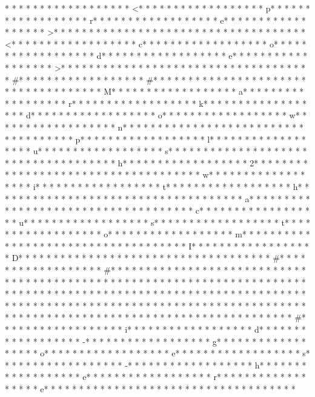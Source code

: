 * * *  * * *  * * *  *  * * *  *  * * *  * <* * *  * * *  * * *  *  * * *  *  * * *  * p* * *  * * *  * * *  *  * * *  *  * * *  * r* * *  * * *  * * *  *  * * *  *  * * *  * e* * *  * * *  * * *  *  * * *  *  * * *  * >* * *  * * *  * * *  *  * * *  *  * * *  * 
* * *  * * *  * * *  *  * * *  *  * * *  * <* * *  * * *  * * *  *  * * *  *  * * *  * c* * *  * * *  * * *  *  * * *  *  * * *  * o* * *  * * *  * * *  *  * * *  *  * * *  * d* * *  * * *  * * *  *  * * *  *  * * *  * e* * *  * * *  * * *  *  * * *  *  * * *  * >* * *  * * *  * * *  *  * * *  *  * * *  * 
* * *  * * *  * * *  *  * * *  *  * * *  * #* * *  * * *  * * *  *  * * *  *  * * *  * #* * *  * * *  * * *  *  * * *  *  * * *  *  * * *  * * *  * * *  *  * * *  *  * * *  * M* * *  * * *  * * *  *  * * *  *  * * *  * a* * *  * * *  * * *  *  * * *  *  * * *  * r* * *  * * *  * * *  *  * * *  *  * * *  * k* * *  * * *  * * *  *  * * *  *  * * *  * d* * *  * * *  * * *  *  * * *  *  * * *  * o* * *  * * *  * * *  *  * * *  *  * * *  * w* * *  * * *  * * *  *  * * *  *  * * *  * n* * *  * * *  * * *  *  * * *  *  * * *  *  * * *  * * *  * * *  *  * * *  *  * * *  * p* * *  * * *  * * *  *  * * *  *  * * *  * l* * *  * * *  * * *  *  * * *  *  * * *  * u* * *  * * *  * * *  *  * * *  *  * * *  * s* * *  * * *  * * *  *  * * *  *  * * *  *  * * *  * * *  * * *  *  * * *  *  * * *  * h* * *  * * *  * * *  *  * * *  *  * * *  * 2* * *  * * *  * * *  *  * * *  *  * * *  *  * * *  * * *  * * *  *  * * *  *  * * *  * w* * *  * * *  * * *  *  * * *  *  * * *  * i* * *  * * *  * * *  *  * * *  *  * * *  * t* * *  * * *  * * *  *  * * *  *  * * *  * h* * *  * * *  * * *  *  * * *  *  * * *  *  * * *  * * *  * * *  *  * * *  *  * * *  * a* * *  * * *  * * *  *  * * *  *  * * *  *  * * *  * * *  * * *  *  * * *  *  * * *  * c* * *  * * *  * * *  *  * * *  *  * * *  * u* * *  * * *  * * *  *  * * *  *  * * *  * s* * *  * * *  * * *  *  * * *  *  * * *  * t* * *  * * *  * * *  *  * * *  *  * * *  * o* * *  * * *  * * *  *  * * *  *  * * *  * m* * *  * * *  * * *  *  * * *  *  * * *  *  * * *  * * *  * * *  *  * * *  *  * * *  * I* * *  * * *  * * *  *  * * *  *  * * *  * D* * *  * * *  * * *  *  * * *  *  * * *  *  * * *  * * *  * * *  *  * * *  *  * * *  * #* * *  * * *  * * *  *  * * *  *  * * *  * #* * *  * * *  * * *  *  * * *  *  * * *  *  * * *  * * *  * * *  *  * * *  *  * * *  *  * * *  * * *  * * *  *  * * *  *  * * *  *  * * *  * * *  * * *  *  * * *  *  * * *  *  * * *  * * *  * * *  *  * * *  *  * * *  *  * * *  * * *  * * *  *  * * *  *  * * *  *  * * *  * * *  * * *  *  * * *  *  * * *  *  * * *  * * *  * * *  *  * * *  *  * * *  *  * * *  * * *  * * *  *  * * *  *  * * *  *  * * *  * * *  * * *  *  * * *  *  * * *  * {* * *  * * *  * * *  *  * * *  *  * * *  * #* * *  * * *  * * *  *  * * *  *  * * *  * i* * *  * * *  * * *  *  * * *  *  * * *  * d* * *  * * *  * * *  *  * * *  *  * * *  * -* * *  * * *  * * *  *  * * *  *  * * *  * g* * *  * * *  * * *  *  * * *  *  * * *  * o* * *  * * *  * * *  *  * * *  *  * * *  * e* * *  * * *  * * *  *  * * *  *  * * *  * s* * *  * * *  * * *  *  * * *  *  * * *  * -* * *  * * *  * * *  *  * * *  *  * * *  * h* * *  * * *  * * *  *  * * *  *  * * *  * e* * *  * * *  * * *  *  * * *  *  * * *  * r* * *  * * *  * * *  *  * * *  *  * * *  * e* * *  * * *  * * *  *  * * *  *  * * *  * }* * *  * * *  * * *  *  * * *  *  * * *  * 
